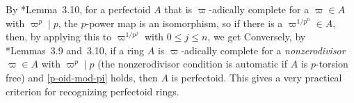 






By \cite{BMS18}*{Lemma~3.10}, for a perfectoid $A$ that is $\varpi$-adically  complete for a $\varpi \in A$ with $\varpi^p \mid p$, the $p$-power map
\be \label{p-oid-mod-pi}
\ee
is an isomorphism, so if there is a $\varpi^{1/p^n} \in A$, then, by applying this to $\varpi^{1/p^j}$ with $0 \le j \le n$, we get
\be \label{p-oid-mod-pin}
\ee
Conversely, by \cite{BMS18}*{Lemmas~3.9 and~3.10}, if a ring $A$ is $\varpi$-adically complete for a \emph{nonzerodivisor} $\varpi \in A$ with $\varpi^p \mid p$ (the nonzerodivisor condition is automatic if $A$ is $p$-torsion free) and \eqref{p-oid-mod-pi} holds, then $A$ is perfectoid. This gives a very practical criterion for recognizing perfectoid rings.






